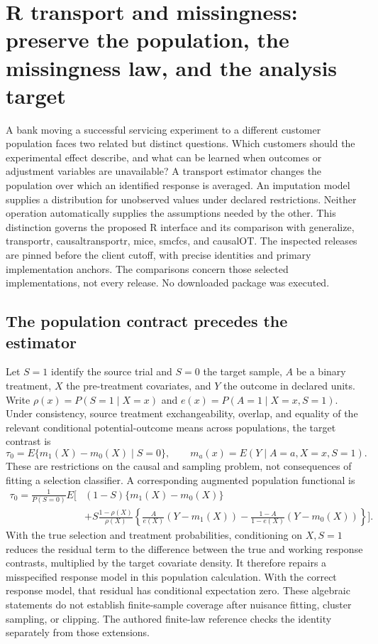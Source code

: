 \section[R transport and missingness contracts]{R transport and missingness: preserve the population, the missingness law, and the analysis target}
\label{sec:exec25-rtm}

A bank moving a successful servicing experiment to a different customer population faces two related but distinct questions. Which customers should the experimental effect describe, and what can be learned when outcomes or adjustment variables are unavailable? A transport estimator changes the population over which an identified response is averaged. An imputation model supplies a distribution for unobserved values under declared restrictions. Neither operation automatically supplies the assumptions needed by the other. This distinction governs the proposed R interface and its comparison with generalize, transportr, causaltransportr, mice, smcfcs, and causalOT. The inspected releases are pinned before the client cutoff, with precise identities and primary implementation anchors. The comparisons concern those selected implementations, not every release. No downloaded package was executed.~\citep{exec25_rtm_generalize,exec25_rtm_transportr,exec25_rtm_causaltransportr,exec25_rtm_mice,exec25_rtm_smcfcs,exec25_rtm_causalOT}

\subsection{The population contract precedes the estimator}

Let $S=1$ identify the source trial and $S=0$ the target sample, $A$ be a binary treatment, $X$ the pre-treatment covariates, and $Y$ the outcome in declared units. Write $\rho(x)=P(S=1\mid X=x)$ and $e(x)=P(A=1\mid X=x,S=1)$. Under consistency, source treatment exchangeability, overlap, and equality of the relevant conditional potential-outcome means across populations, the target contrast is
\[
 \tau_0=E\{m_1(X)-m_0(X)\mid S=0\},\qquad
 m_a(x)=E(Y\mid A=a,X=x,S=1).
\]
These are restrictions on the causal and sampling problem, not consequences of fitting a selection classifier. A corresponding augmented population functional is
\begin{align*}
 \tau_0=\frac{1}{P(S=0)}E\bigg[&(1-S)\{m_1(X)-m_0(X)\}\\
 &+S\frac{1-\rho(X)}{\rho(X)}
 \left\{\frac{A}{e(X)}(Y-m_1(X))
       -\frac{1-A}{1-e(X)}(Y-m_0(X))\right\}\bigg].
\end{align*}
With the true selection and treatment probabilities, conditioning on $X,S=1$ reduces the residual term to the difference between the true and working response contrasts, multiplied by the target covariate density. It therefore repairs a misspecified response model in this population calculation. With the correct response model, that residual has conditional expectation zero. These algebraic statements do not establish finite-sample coverage after nuisance fitting, cluster sampling, or clipping. The authored finite-law reference checks the identity separately from those extensions.~\citep{exec25_rtm_choice}

